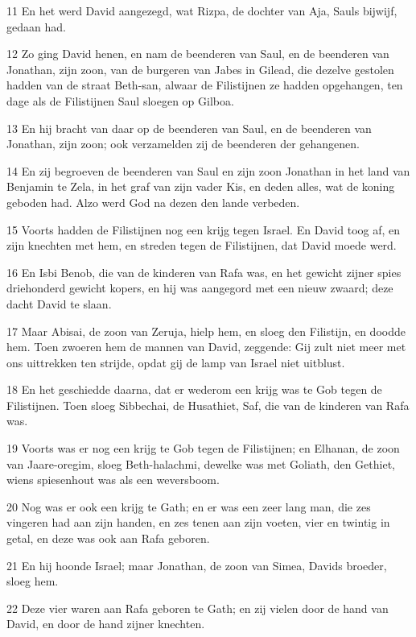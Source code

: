 \par 11 En het werd David aangezegd, wat Rizpa, de dochter van Aja, Sauls bijwijf, gedaan had.
\par 12 Zo ging David henen, en nam de beenderen van Saul, en de beenderen van Jonathan, zijn zoon, van de burgeren van Jabes in Gilead, die dezelve gestolen hadden van de straat Beth-san, alwaar de Filistijnen ze hadden opgehangen, ten dage als de Filistijnen Saul sloegen op Gilboa.
\par 13 En hij bracht van daar op de beenderen van Saul, en de beenderen van Jonathan, zijn zoon; ook verzamelden zij de beenderen der gehangenen.
\par 14 En zij begroeven de beenderen van Saul en zijn zoon Jonathan in het land van Benjamin te Zela, in het graf van zijn vader Kis, en deden alles, wat de koning geboden had. Alzo werd God na dezen den lande verbeden.
\par 15 Voorts hadden de Filistijnen nog een krijg tegen Israel. En David toog af, en zijn knechten met hem, en streden tegen de Filistijnen, dat David moede werd.
\par 16 En Isbi Benob, die van de kinderen van Rafa was, en het gewicht zijner spies driehonderd gewicht kopers, en hij was aangegord met een nieuw zwaard; deze dacht David te slaan.
\par 17 Maar Abisai, de zoon van Zeruja, hielp hem, en sloeg den Filistijn, en doodde hem. Toen zwoeren hem de mannen van David, zeggende: Gij zult niet meer met ons uittrekken ten strijde, opdat gij de lamp van Israel niet uitblust.
\par 18 En het geschiedde daarna, dat er wederom een krijg was te Gob tegen de Filistijnen. Toen sloeg Sibbechai, de Husathiet, Saf, die van de kinderen van Rafa was.
\par 19 Voorts was er nog een krijg te Gob tegen de Filistijnen; en Elhanan, de zoon van Jaare-oregim, sloeg Beth-halachmi, dewelke was met Goliath, den Gethiet, wiens spiesenhout was als een weversboom.
\par 20 Nog was er ook een krijg te Gath; en er was een zeer lang man, die zes vingeren had aan zijn handen, en zes tenen aan zijn voeten, vier en twintig in getal, en deze was ook aan Rafa geboren.
\par 21 En hij hoonde Israel; maar Jonathan, de zoon van Simea, Davids broeder, sloeg hem.
\par 22 Deze vier waren aan Rafa geboren te Gath; en zij vielen door de hand van David, en door de hand zijner knechten.

